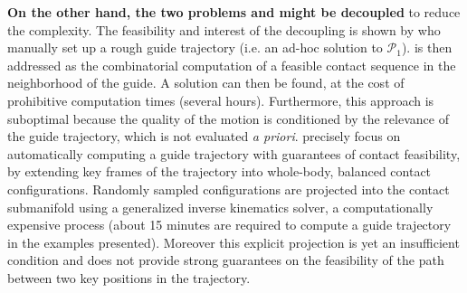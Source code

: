 \textbf{On the other hand, the two problems \Pa and \Pb might be decoupled} to reduce the complexity. The feasibility and interest of the decoupling is shown by \citeauthor{DBLP:conf/iser/EscandeKMG08} who manually set up a rough guide trajectory (i.e. an ad-hoc solution to $\mathcal{P}_1$). \Pb  is then addressed as the combinatorial computation of a feasible contact sequence in the neighborhood of the guide. A solution can then be found, at the cost of prohibitive computation times (several hours). Furthermore, this approach is suboptimal because the quality of the motion is conditioned by the relevance of the guide trajectory,  which is not evaluated \textit{a priori}. \citeauthor{Bouyarmane2009} precisely focus on automatically computing a guide trajectory with guarantees of contact feasibility, by extending key frames of the trajectory into whole-body, balanced contact configurations. Randomly sampled configurations are projected into the contact submanifold using a generalized inverse kinematics solver, a computationally expensive process (about 15 minutes are required to compute a guide trajectory in the examples presented). Moreover this explicit projection is yet an insufficient condition and does not provide strong guarantees on the feasibility of the path between two key positions in the trajectory.
 

